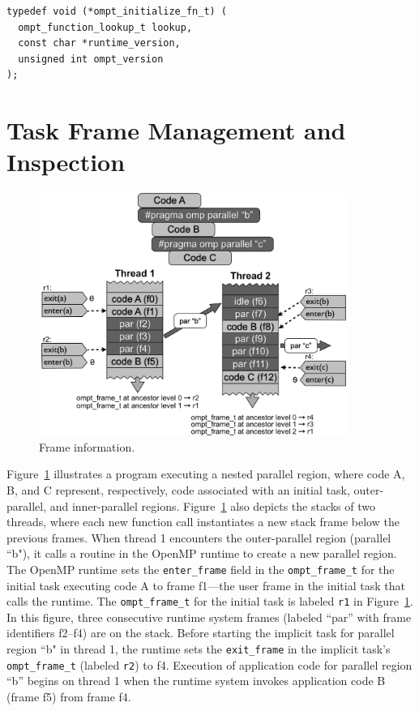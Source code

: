 \documentclass{article}
\begin{document}
\begin{verbatim}
typedef void (*ompt_initialize_fn_t) (
  ompt_function_lookup_t lookup,
  const char *runtime_version, 
  unsigned int ompt_version
);
\end{verbatim}



\clearpage
\section{Task Frame Management and Inspection}
\label{app:frame}

   \begin{figure}[h]
    \centering
        \includegraphics[width=4in]{callstack-cropped.pdf}
    \caption{Frame information.}
    \label{fig:frame}
\end{figure}

\noindent
Figure~\ref{fig:frame} illustrates a program executing a nested parallel region, where code A, B, and C represent, respectively, code associated with an initial task, outer-parallel, and inner-parallel regions.  Figure~\ref{fig:frame}  also depicts the stacks of two threads, where each new function call instantiates a new stack frame below the previous frames. When thread 1 encounters the outer-parallel region (parallel ``b"), it calls a routine in the OpenMP runtime to create a new parallel region. The OpenMP runtime sets the \verb|enter_frame| field in the \verb|ompt_frame_t| for the initial task executing code A to  frame f1---the user frame in the initial task that calls the runtime. The  \verb|ompt_frame_t| for the initial task is labeled  \verb|r1| in Figure~\ref{fig:frame}. In this figure, three consecutive runtime system frames (labeled ``par'' with frame identifiers f2--f4) are on the stack. 
Before starting the implicit task for parallel region ``b" in thread 1, the runtime sets the \verb|exit_frame| in the implicit task's \verb|ompt_frame_t|  (labeled \verb|r2|) to f4. Execution of application code for parallel region ``b''  begins on thread 1  when the runtime system invokes application code B (frame f5) from frame f4. 
\end{document}
